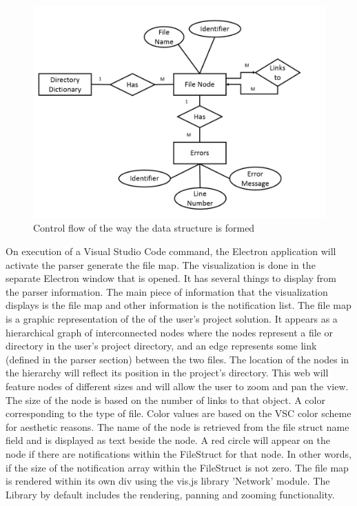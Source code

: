 \documentclass[letterpaper,10pt,titlepage,draftclsnofoot,onecolumn,onesided] {IEEEtran}
\begin{document}
\begin{figure}[h]
	\centering
	\includegraphics[width=.75\textwidth]{InformationERDEPS-eps-converted-to}
	\caption{Control flow of the way the data structure is formed}
\end{figure}

On execution of a Visual Studio Code command, the Electron application will activate the parser generate the file map. 
The visualization is done in the separate Electron window that is opened.
It has several things to display from the parser information. 
The main piece of information that the visualization displays is the file map and other information is the notification list. 
The file map is a graphic representation of the of the user's project solution. 
It appears as a hierarchical graph of interconnected nodes where the nodes represent a file or directory in the user's project directory, and an edge represents some link (defined in the parser section) between the two files. 
The location of the nodes in the hierarchy will reflect its position in the project's directory. 
This web will feature nodes of different sizes and will allow the user to zoom and pan the view. 
The size of the node is based on the number of links to that object.
A color corresponding to the type of file. 
Color values are based on the VSC color scheme for aesthetic reasons.
The name of the node is retrieved from the file struct name field and is displayed as text beside the node. 
A red circle will appear on the node if there are notifications within the FileStruct for that node. 
In other words, if the size of the notification array within the FileStruct is not zero. 
The file map is rendered within its own div using the vis.js library 'Network' module. 
The Library by default includes the rendering, panning and zooming functionality. \\
\end{document}
